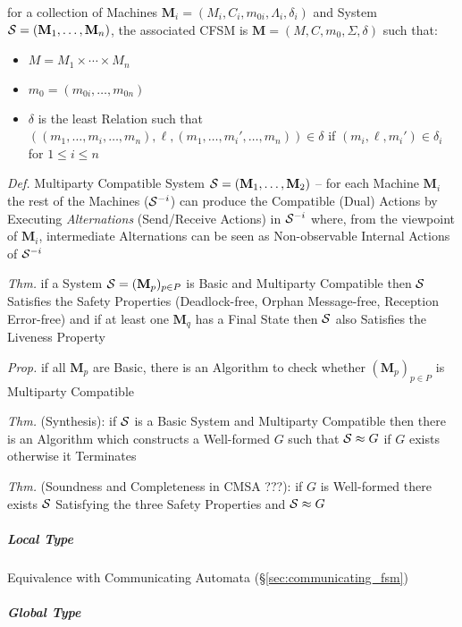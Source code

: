 for a collection of Machines $\mathbf{M}_i = (M_i, C_i, m_{0i},
\Lambda_i, \delta_i)$ and System $\mathcal{S} = (\mathbf{M}_1, \ldots,
\mathbf{M}_n)$, the associated CFSM is $\mathbf{M} =
(M,C,m_0,\Sigma,\delta)$ such that:
\begin{itemize}
  \item $M = M_1 \times \cdots \times M_n$
  \item $m_0 = (m_{0i}, \ldots, m_{0n})$
  \item $\delta$ is the least Relation such that
    $((m_1,\ldots,m_i,\ldots,m_n), \ell,
    (m_1,\ldots,m_i',\ldots,m_n)) \in \delta$ if $(m_i,\ell,m_i') \in
    \delta_i$ for $1 \leq i \leq n$
\end{itemize}


\emph{Def.} Multiparty Compatible System $\mathcal{S} = (\mathbf{M}_1,
\ldots, \mathbf{M}_2)$ -- for each Machine $\mathbf{M}_i$ the rest of
the Machines ($\mathcal{S}^{-i}$) can produce the Compatible (Dual)
Actions by Executing \emph{Alternations} (Send/Receive Actions) in
$\mathcal{S}^{-i}$ where, from the viewpoint of $\mathbf{M}_i$,
intermediate Alternations can be seen as Non-observable Internal
Actions of $\mathcal{S}^{-i}$


\emph{Thm.} if a System $\mathcal{S} = (\mathbf{M}_p)_{p \in P}$ is
Basic and Multiparty Compatible then $\mathcal{S}$ Satisfies the Safety
Properties (Deadlock-free, Orphan Message-free, Reception Error-free)
and if at least one $\mathbf{M}_q$ has a Final State then $\mathcal{S}$
also Satisfies the Liveness Property

\emph{Prop.} if all $\mathbf{M}_p$ are Basic, there is an Algorithm to
check whether $(\mathbf{M}_p)_{p \in P}$ is Multiparty Compatible

\emph{Thm.} (Synthesis): if $\mathcal{S}$ is a Basic System and
Multiparty Compatible then there is an Algorithm which constructs a
Well-formed $G$ such that $\mathcal{S} \approx G$ if $G$ exists
otherwise it Terminates

\emph{Thm.} (Soundness and Completeness in CMSA ???): if $G$ is
Well-formed there exists $\mathcal{S}$ Satisfying the three Safety
Properties and $\mathcal{S} \approx G$



\subparagraph{Local Type}\label{sec:local_type}\hfill

Equivalence with Communicating Automata
(\S\ref{sec:communicating_fsm})



\subparagraph{Global Type}\label{sec:global_type}\hfill


